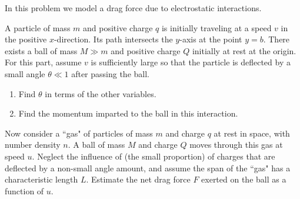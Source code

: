 \documentclass[11pt]{scrartcl}
\begin{document}
\begin{prob}
    In this problem we model a drag force due to electrostatic interactions. 
    \begin{anum}
        \item A particle of mass $m$ and positive charge $q$ is initially traveling at a speed $v$ in the positive $x$-direction. Its path intersects the $y$-axis at the point $y=b$. There exists a ball of mass $M\gg m$ and positive charge $Q$ initially at rest at the origin. For this part, assume $v$ is sufficiently large so that the particle is deflected by a small angle $\theta\ll 1$ after passing the ball. 
        \begin{enumerate}[label=(\roman*)]
        \item Find $\theta$ in terms of the other variables. 
        \item Find the momentum imparted to the ball in this interaction. 
        \end{enumerate}
        \item Now consider a ``gas" of particles of mass $m$ and charge $q$ at rest in space, with number density $n$. A ball of mass $M$ and charge $Q$ moves through this gas at speed $u$. Neglect the influence of (the small proportion) of charges that are deflected by a non-small angle amount, and assume the span of the ``gas" has a characteristic length $L$. Estimate the net drag force $F$ exerted on the ball as a function of $u$.
    \end{anum}
\end{prob}
\end{document}

